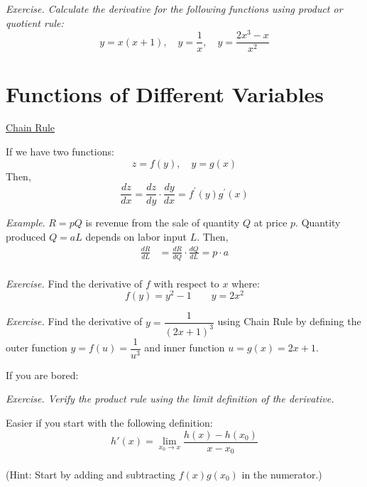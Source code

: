 \documentclass{./../../Latex/handout}
\begin{document}
\newpage
\textit{Exercise. Calculate the derivative for the following functions using product or quotient rule:}
$$ y = x(x+1), \quad y=\frac{1}{x}, \quad y = \frac{2x^3-x}{x^2}$$

\newpage 
\section*{Functions of Different Variables}

\underline{Chain Rule} 

If we have two functions:
$$ z=f(y), \quad y=g(x) $$
Then, 
$$\frac{d z}{d x}=\frac{d z}{d y} \cdot \frac{d y}{d x}=f^{\prime}(y) g^{\prime}(x) $$

\textit{Example}. $R = p Q $ is revenue from the sale of quantity $Q$ at price $p$. Quantity produced $Q= a L$ depends on labor input $L$. Then,
$$
\begin{aligned}
\frac{d R}{d L} &=\frac{d R}{d Q} \cdot \frac{d Q}{d L} = p \cdot a\\
\end{aligned}
$$


\textit{Exercise.} Find the derivative of $f$ with respect to $x$ where:
$$ f(y) = y^2-1 \quad \quad y = 2x^2  $$

\vspace{3cm}
\textit{Exercise.} Find the derivative of $y = \dfrac{1}{(2x+1)^3}$ using Chain Rule by defining the outer function $y = f(u) = \dfrac{1}{u^3}$ and inner function $u = g(x) = 2x+1$. 

\newpage

If you are bored:

\textit{Exercise. Verify the product rule using the limit definition of the derivative.} 

Easier if you start with the following definition:
$$ h'(x)=\lim _{x_0 \rightarrow x}  \frac{h(x)-h(x_0)}{x-x_0} $$\\
(Hint: Start by adding and subtracting $f(x)g(x_0)$ in the numerator.)
\end{document}
